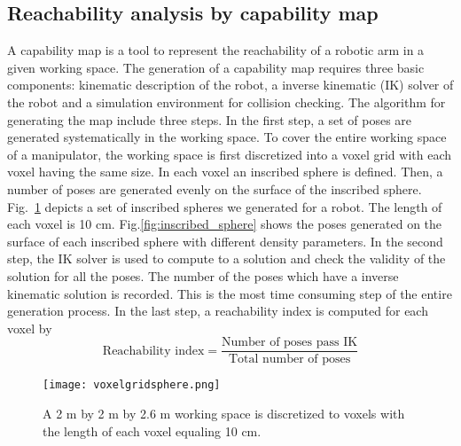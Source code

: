 \subsection{Reachability analysis by capability map}
A capability map is a tool to represent the reachability of a robotic arm in a given working space. The generation of a capability map requires three basic components: kinematic description of the robot, a inverse kinematic (IK) solver of the robot and a simulation environment for collision checking. The algorithm for generating the map include three steps. In the first step, a set of poses are generated systematically in the working space. To cover the entire working space of a manipulator, the working space is first discretized into a voxel grid with each voxel having the same size. In each voxel an inscribed sphere is defined. Then, a number of poses are generated evenly on the surface of the inscribed sphere. Fig.~\ref{fig:voxelgrid_sphere} depicts a set of inscribed spheres we generated for a robot. The length of each voxel is 10 cm. Fig.\ref{fig:inscribed_sphere} shows the poses generated on the surface of each inscribed sphere with different density parameters.  In the second step, the IK solver is used to compute to a solution and check the validity of the solution for all the poses. The number of the poses which have a inverse kinematic solution is recorded. This is the most time consuming step of the entire generation process. In the last step, a reachability index is computed for each voxel by 
\begin{equation}
\text{Reachability index} = \frac{ \text{Number of poses pass IK} }{ \text{Total number of poses} }   
\end{equation}

\begin{figure}[!htbp]
\centering
\texttt{[image: voxelgridsphere.png]}
\captionsetup{justification=raggedright}
\caption{A 2 m by 2 m by 2.6 m working space is discretized to voxels with the length  of each voxel equaling 10 cm. }
\label{fig:voxelgrid_sphere}       %
\end{figure} 


